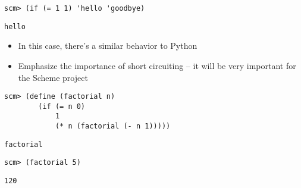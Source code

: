 \begin{lstlisting}
scm> (if (= 1 1) 'hello 'goodbye)
\end{lstlisting}
\begin{solution}[.25in]
\texttt{hello}
\end{solution}

\begin{guide}
\begin{itemize}
\item In this case, there's a similar behavior to Python
\item Emphasize the importance of short circuiting -- it will be very important for the Scheme project
\end{itemize}
\end{guide}
\begin{blocksection}
\begin{lstlisting}
scm> (define (factorial n)
        (if (= n 0)
            1
            (* n (factorial (- n 1)))))
\end{lstlisting}
\begin{solution}[.25in]
\texttt{factorial}
\end{solution}

\begin{lstlisting}
scm> (factorial 5)
\end{lstlisting}
\begin{solution}[.25in]
\texttt{120}
\end{solution}

\begin{comment}
\begin{lstlisting}
scm> (= 2 3)
\end{lstlisting}
\begin{solution}[.25in]
\texttt{\#f}
\end{solution}

\begin{lstlisting}
scm> (= '() '())
\end{lstlisting}
\begin{solution}[.25in]
\texttt{Error}
\end{solution}

\begin{lstlisting}
scm> (eq? '() '())
\end{lstlisting}
\begin{solution}[.25in]
\texttt{\#t}
\end{solution}

\begin{lstlisting}
scm> (eq? nil nil)
\end{lstlisting}
\begin{solution}[.25in]
\texttt{\#t}
\end{solution}


\end{comment}
\end{blocksection}
